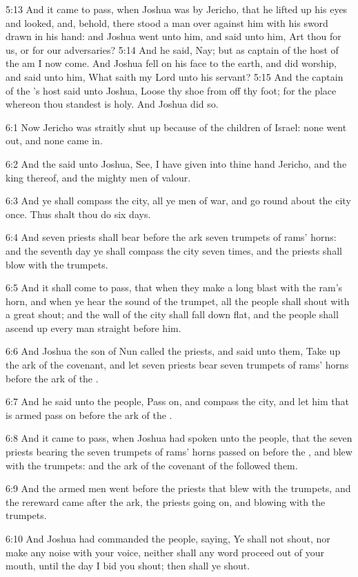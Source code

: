 5:13 And it came to pass, when Joshua was by Jericho, that he lifted up his eyes and looked, and, behold, there stood a man over against him with his sword drawn in his hand: and Joshua went unto him, and said unto him, Art thou for us, or for our adversaries?  5:14 And he said, Nay; but as captain of the host of the \LORD am I now come. And Joshua fell on his face to the earth, and did worship, and said unto him, What saith my Lord unto his servant?  5:15 And the captain of the \LORD's host said unto Joshua, Loose thy shoe from off thy foot; for the place whereon thou standest is holy. And Joshua did so.

6:1 Now Jericho was straitly shut up because of the children of Israel: none went out, and none came in.

6:2 And the \LORD said unto Joshua, See, I have given into thine hand Jericho, and the king thereof, and the mighty men of valour.

6:3 And ye shall compass the city, all ye men of war, and go round about the city once. Thus shalt thou do six days.

6:4 And seven priests shall bear before the ark seven trumpets of rams' horns: and the seventh day ye shall compass the city seven times, and the priests shall blow with the trumpets.

6:5 And it shall come to pass, that when they make a long blast with the ram's horn, and when ye hear the sound of the trumpet, all the people shall shout with a great shout; and the wall of the city shall fall down flat, and the people shall ascend up every man straight before him.

6:6 And Joshua the son of Nun called the priests, and said unto them, Take up the ark of the covenant, and let seven priests bear seven trumpets of rams' horns before the ark of the \LORD.

6:7 And he said unto the people, Pass on, and compass the city, and let him that is armed pass on before the ark of the \LORD.

6:8 And it came to pass, when Joshua had spoken unto the people, that the seven priests bearing the seven trumpets of rams' horns passed on before the \LORD, and blew with the trumpets: and the ark of the covenant of the \LORD followed them.

6:9 And the armed men went before the priests that blew with the trumpets, and the rereward came after the ark, the priests going on, and blowing with the trumpets.

6:10 And Joshua had commanded the people, saying, Ye shall not shout, nor make any noise with your voice, neither shall any word proceed out of your mouth, until the day I bid you shout; then shall ye shout.

